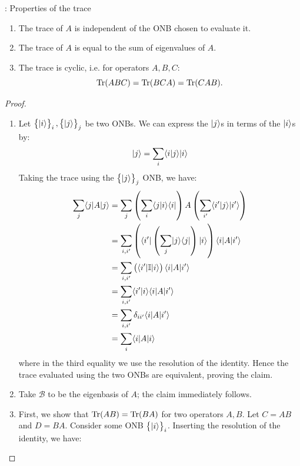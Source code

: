 \begin{propbox}{: Properties of the trace}
    \begin{enumerate}
        \item The trace of $A$ is independent of the ONB chosen to evaluate it.
        \item The trace of $A$ is equal to the sum of eigenvalues of $A$. 
        \item The trace is cyclic, i.e. for operators $A, B, C$:
        \begin{equation}
            \mathrm{Tr}(ABC) = \mathrm{Tr}(BCA) = \mathrm{Tr}(CAB).
        \end{equation}
    \end{enumerate}
\end{propbox}
\begin{proof}
    \begin{enumerate}
        \item Let $\set{\lvert i \rangle}_i, \set{\lvert j \rangle}_j$ be two ONBs. We can express the $\lvert j \rangle$s in terms of the $\lvert i \rangle$s by:
        \begin{equation}
            \lvert j \rangle = \sum_i \langle i \lvert j \rangle \lvert i \rangle
        \end{equation}
        Taking the trace using the $\set{\lvert j \rangle}_j$ ONB, we have:
        \begin{equation}
            \begin{split}
                \sum_j \langle j \rvert A\lvert j \rangle &= \sum_j \left(\sum_i \langle j \lvert i \rangle\langle i \rvert\right)A\left(\sum_{i'}\langle i' \lvert j \rangle\lvert i' \rangle\right)
                \\ &= \sum_{i, i'} \left(\langle i' \rvert \left(\sum_j \lvert j \rangle \langle j \rvert \right)\lvert i \rangle\right) \langle i \rvert A\lvert i' \rangle
                \\ &= \sum_{i, i'} \left(\langle i' \rvert \mathbb{I} \lvert i \rangle\right) \langle i \rvert A\lvert i' \rangle
                \\ &= \sum_{i, i'} \langle i' \lvert i \rangle\langle i \rvert A\lvert i' \rangle
                \\ &= \sum_{i, i'}\delta_{ii'}\langle i \rvert A\lvert i' \rangle
                \\ &= \sum_i \langle i \rvert A\lvert i \rangle
            \end{split}
        \end{equation}
        where in the third equality we use the resolution of the identity. Hence the trace evaluated using the two ONBs are equivalent, proving the claim.
        \item Take $\mathcal{B}$ to be the eigenbasis of $A$; the claim immediately follows. 
        \item First, we show that $\mathrm{Tr}(AB) = \mathrm{Tr}(BA)$ for two operators $A, B$. Let $C = AB$ and $D = BA$. Consider some ONB $\set{\lvert i \rangle}_i$. Inserting the resolution of the identity, we have:

\end{enumerate}
\end{proof}
